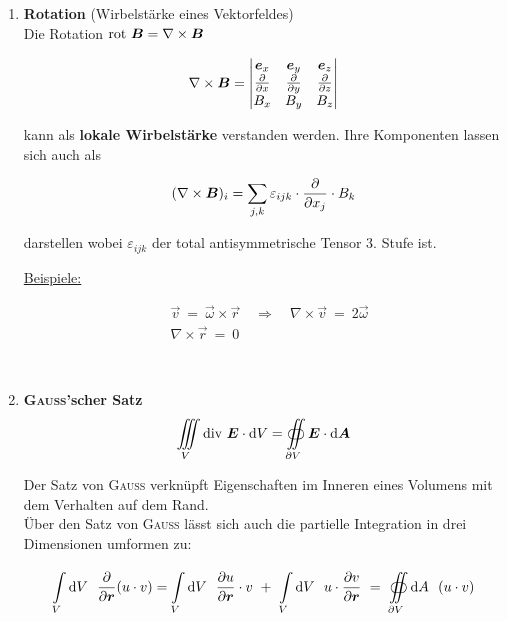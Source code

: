 \begin{enumerate}
\ \\
\item \textbf{Rotation} (Wirbelstärke eines Vektorfeldes)\\

Die Rotation $\text{rot }\bm{B}=\nabla\times\bm{B}$

\begin{equation*}
\nabla\times\bm{B}=\begin{vmatrix}
\bm{e}_x & \bm{e}_y & \bm{e}_z \\
\frac{\partial{}}{\partial{x}} & \frac{\partial{}}{\partial{y}} & \frac{\partial{}}{\partial{z}}\\
B_x & B_y & B_z
\end{vmatrix}
\end{equation*}

kann als \textbf{lokale Wirbelstärke} verstanden werden. Ihre Komponenten lassen sich auch als

\begin{equation*}
(\nabla\times\bm{B})_i=\sum\limits_{j,k}\varepsilon_{ijk}\cdot\frac{\partial{}}{\partial{x_j}}\cdot B_k
\end{equation*}

darstellen wobei $\varepsilon_{ijk}$ der total antisymmetrische Tensor 3. Stufe ist.\\
\newpage

\underline{Beispiele:}

\begin{align*}
&\vec{v} \ = \ \vec{\omega}\times\vec{r} \quad \Rightarrow \quad \nabla\times\vec{v} \ = \ 2\vec{\omega}\\
&\nabla\times\vec{r} \ = \ 0
\end{align*}

\ \\
\item \textbf{\textsc{Gauss}'scher Satz}\\

\begin{equation*}
\iiint\limits_V\text{div }\bm{E}\cdot\mathrm{d} V=\oiint\limits_{\partial V}\bm{E}\cdot\mathrm{d} \bm{A}
\end{equation*}

Der Satz von \textsc{Gauss} verknüpft Eigenschaften im Inneren eines Volumens mit dem Verhalten auf dem Rand.\\

Über den Satz von \textsc{Gauss} lässt sich auch die partielle Integration in drei Dimensionen umformen zu:

\begin{equation*}
\int\limits_{{V}}^{{}}\mathrm{d}{V}\  \ \frac{\partial{}}{\partial{\bm{r}}} (u\cdot v) = \int\limits_{{V}}^{{}}\mathrm{d}{V}\  \  \frac{\partial{u}}{\partial{\bm{r}}}\cdot v \ + \ \int\limits_{{V}}^{{}}\mathrm{d}{V}\  \  u \cdot\frac{\partial{v}}{\partial{\bm{r}}} \ = \ \oiint\limits_{{\partial V}}^{{}}\mathrm{d}{A}\  \  (u\cdot v)
\end{equation*}


\end{enumerate}
